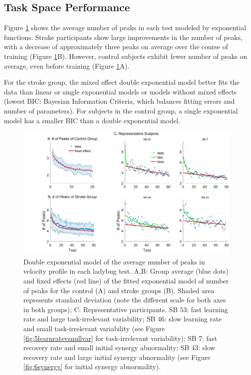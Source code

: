 \subsection{Task Space Performance}

Figure \ref{fig:3nopfixran} shows the average number of peaks in each test modeled by exponential functions. 
Stroke participants show large improvements in the number of peaks, with a decrease of approximately three peaks on average over the course of training (Figure \ref{fig:3nopfixran}B). 
However, control subjects exhibit fewer number of peaks on average, even before training (Figure \ref{fig:3nopfixran}A).

For the stroke group, the mixed effect double exponential model better fits the data than linear or single exponential models or models without mixed effects (lowest BIC: Bayesian Information Criteria, which balances fitting errors and number of parameters). 
For subjects in the control group, a single exponential model has a smaller BIC than a double exponential model.

\begin{figure}
	\centering
	\includegraphics[width=1\linewidth]{figures/3nopFixRan}
	\caption[Double Exponential Model]
	{Double exponential model of the average number of peaks in velocity profile in each ladybug test. 
		A,B: Group average (blue dots) and fixed effects (red line) of the fitted exponential model of number of peaks for the control (A) and stroke groups (B). Shaded area represents standard deviation (note the different scale for both axes in both groups); 
		C: Representative participants. 
		SB 53: fast learning rate and large task-irrelevant variability; 
		SB 46: slow learning rate and small task-irrelevant variability (see Figure \ref{fig:5learnratevsnullvar} for task-irrelevant variability);
		SB 7: fast recovery rate and small initial synergy abnormality;
		SB 43: slow recovery rate and large initial synergy abnormality (see Figure \ref{fig:6synergy} for initial synergy abnormality).
	}
	\label{fig:3nopfixran}
\end{figure}

